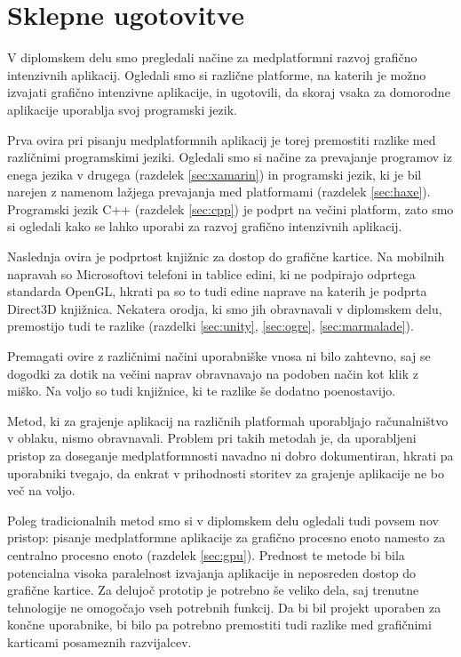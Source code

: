 \chapter{Sklepne ugotovitve}

V diplomskem delu smo pregledali načine za medplatformni razvoj grafično intenzivnih aplikacij. Ogledali smo si različne platforme, na katerih je možno izvajati grafično intenzivne aplikacije, in ugotovili, da skoraj vsaka za domorodne aplikacije uporablja svoj programski jezik. 

Prva ovira pri pisanju medplatformnih aplikacij je torej premostiti razlike med različnimi programskimi jeziki. Ogledali smo si načine za prevajanje programov iz enega jezika v drugega (razdelek \ref{sec:xamarin}) in programski jezik, ki je bil narejen z namenom lažjega prevajanja med platformami (razdelek \ref{sec:haxe}). Programski jezik C++ (razdelek \ref{sec:cpp}) je podprt na večini platform, zato smo si ogledali kako se lahko uporabi za razvoj grafično intenzivnih aplikacij.

Naslednja ovira je podprtost knjižnic za dostop do grafične kartice. Na mobilnih napravah so Microsoftovi telefoni in tablice edini, ki ne podpirajo odprtega standarda OpenGL, hkrati pa so to tudi edine naprave na katerih je podprta Direct3D knjižnica. Nekatera orodja, ki smo jih obravnavali v diplomskem delu, premostijo tudi te razlike (razdelki \ref{sec:unity}, \ref{sec:ogre}, \ref{sec:marmalade}).

Premagati ovire z različnimi načini uporabniške vnosa ni bilo zahtevno, saj se dogodki za dotik na večini naprav obravnavajo na podoben način kot klik z miško. Na voljo so tudi knjižnice, ki te razlike še dodatno poenostavijo.

Metod, ki za grajenje aplikacij na različnih platformah uporabljajo računalništvo v oblaku, nismo obravnavali. Problem pri takih metodah je, da uporabljeni pristop za doseganje medplatformnosti navadno ni dobro dokumentiran, hkrati pa uporabniki tvegajo, da enkrat v prihodnosti storitev za grajenje aplikacije ne bo več na voljo.  

Poleg tradicionalnih metod smo si v diplomskem delu ogledali tudi povsem nov pristop: pisanje medplatformne aplikacije za grafično procesno enoto namesto za centralno procesno enoto (razdelek \ref{sec:gpu}). Prednost te metode bi bila potencialna visoka paralelnost izvajanja aplikacije in neposreden dostop do grafične kartice. Za delujoč prototip je potrebno še veliko dela, saj trenutne tehnologije ne omogočajo vseh potrebnih funkcij. Da bi bil projekt uporaben za končne uporabnike, bi bilo pa potrebno premostiti tudi razlike med grafičnimi karticami posameznih razvijalcev. 

